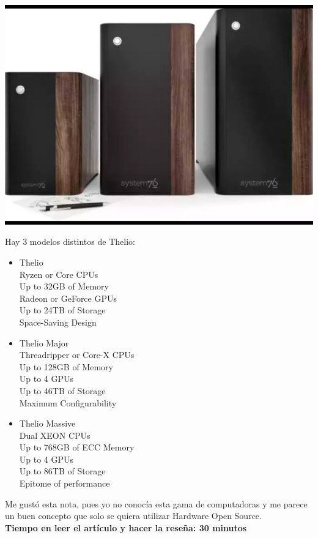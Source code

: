 \documentclass[a4paper, 11pt, oneside]{article}
\begin{document}
\begin{center}
    \includegraphics[scale=0.20]{thelio0.jpeg}
\end{center}
Hay 3 modelos distintos de Thelio:
\begin{itemize}
    \item Thelio\\
    Ryzen or Core CPUs\\
    Up to 32GB of Memory\\
    Radeon or GeForce GPUs\\
    Up to 24TB of Storage\\
    Space-Saving Design
    \item Thelio Major\\
    Threadripper or Core-X CPUs\\
    Up to 128GB of Memory\\
    Up to 4 GPUs\\
    Up to 46TB of Storage\\
    Maximum Configurability
    \item Thelio Massive\\
    Dual XEON CPUs\\
    Up to 768GB of ECC Memory\\
    Up to 4 GPUs\\
    Up to 86TB of Storage\\
    Epitome of performance
\end{itemize}

Me gustó esta nota, pues yo no conocía esta gama de computadoras y me parece un buen concepto que solo se quiera utilizar Hardware Open Source.\\
\textbf{Tiempo en leer el artículo y hacer la reseña: 30 minutos}
\end{document}
